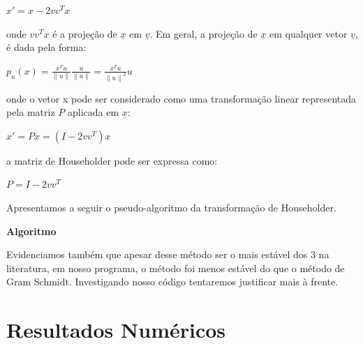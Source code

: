 \documentclass[12pt, a4paper]{article}
\begin{document}
\begin{center}
    $x' = x - 2vv^{T}x$
\end{center}
onde $vv^{T}x$ é a projeção de $\underline{x}$ em $\underline{v}$. Em geral, a projeção de  $\underline{x}$ em qualquer vetor $\underline{v}$, é dada pela forma:
\begin{center}
    $p_{u}(x) = \frac{x^{T}u}{\left \| u \right \|} \frac{u}{\left \| u \right \|} = \frac{x^{T}u}{\left \| u \right \|^{2}}u$
\end{center}
onde o vetor x pode ser considerado como uma transformação linear representada pela matriz $P$ aplicada em $\underline{x}$:

\begin{center}
      $x' = Px = (I - 2vv^{T})x$
\end{center}
a matriz de Householder pode ser expressa como:
\begin{center}
    $P = I - 2vv^{T}$
\end{center}

\noindent
Apresentamos a seguir o pseudo-algoritmo da transformação de Householder.


\begin{algorithm}
\SetAlgoLined
   \label{alg1}
   \caption*{\textbf{Algoritmo}}
 \end{algorithm}
 
 Evidenciamos também que apesar desse método ser o mais estável dos 3 na literatura, em nosso programa, o método foi menos estável do que o método de Gram Schmidt. Investigando nosso código tentaremos justificar mais à frente.
\newpage

\section{Resultados Numéricos}
\end{document}
